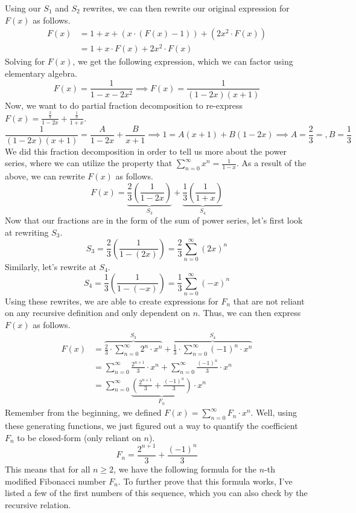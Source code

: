 Using our $S_1$ and $S_2$ rewrites, we can then rewrite our original expression for $F(x)$ as follows. 
\begin{align*}
F(x) &= 1 + x + \left(x \cdot (F(x) - 1)\right) + \left(2x^2 \cdot F(x)\right)\\
&= 1 + x \cdot F(x) + 2x^2 \cdot F(x)
\end{align*}
Solving for $F(x)$, we get the following expression, which we can factor using elementary algebra.
$$
F(x) = \frac{1}{1 - x - 2x^2} \implies F(x) = \frac{1}{(1-2x)(x+1)}
$$
Now, we want to do partial fraction decomposition to re-express $F(x) = \frac{\frac{2}{3}}{1 - 2x} + \frac{\frac{1}{3}}{1+x}$.
$$
\frac{1}{(1-2x)(x+1)} = \frac{A}{1-2x} + \frac{B}{x+1} \implies 1 = A(x+1) + B(1-2x) \implies A = \frac{2}{3} = , B = \frac{1}{3}
$$
We did this fraction decomposition in order to tell us more about the power series, where we can utilize the property that $\sum_{n=0}^\infty x^n = \frac{1}{1-x}$. As a result of the above, we can rewrite $F(x)$ as follows.
$$
F(x) = \underbrace{\frac{2}{3} \left(\frac{1}{1-2x}\right)}_{S_3} + \underbrace{\frac{1}{3} \left(\frac{1}{1+x}\right)}_{S_4}
$$
Now that our fractions are in the form of the sum of power series, let's first look at rewriting $S_3$. 
$$
S_3 = \frac{2}{3}\left(\frac{1}{1-\left(2x\right)}\right) = \frac{2}{3} \sum_{n=0}^\infty (2x)^n
$$
Similarly, let's rewrite at $S_4$. 
$$
S_4 = \frac{1}{3} \left(\frac{1}{1-(-x)}\right) = \frac{1}{3}\sum_{n=0}^\infty (-x)^n
$$
Using these rewrites, we are able to create expressions for $F_n$ that are not reliant on any recursive definition and only dependent on $n$. Thus, we can then express $F(x)$ as follows.
\begin{align*}
F(x) &= \overbrace{\frac{2}{3} \cdot \sum_{n=0}^\infty 2^n \cdot x^n}^{S_3} + \overbrace{\frac{1}{3} \cdot \sum_{n=0}^\infty (-1)^n\cdot  x^n}^{S_4} \\
&=  \sum_{n=0}^\infty \frac{2^{n+1}}{3} \cdot x^n + \sum_{n=0}^\infty \frac{(-1)^n}{3} \cdot x^n \\
&= \sum_{n=0}^\infty \underbrace{\left(\frac{2^{n+1}}{3} + \frac{(-1)^n}{3}\right)}_{F_n} \cdot x^n
\end{align*}
Remember from the beginning, we defined $F(x) = \sum_{n=0}^\infty F_n \cdot x^n$. Well, using these generating functions, we just figured out a way to quantify the coefficient $F_n$ to be closed-form (only reliant on $n$). 
$$
F_n = \frac{2^{n+1}}{3}  + \frac{(-1)^n}{3}
$$ 
This means that for all $n \geq 2$, we have the following formula for the $n$-th modified Fibonacci number $F_n$. To further prove that this formula works, I've listed a few of the first numbers of this sequence, which you can also check by the recursive relation.
